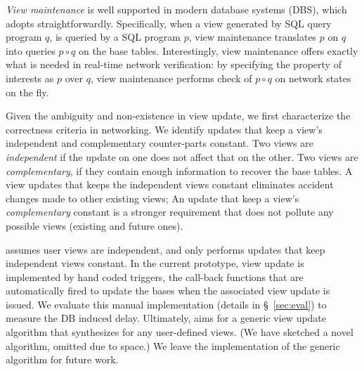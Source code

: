 \textit{View maintenance} is well supported in modern database systems
(DBS), which \Sys adopts straightforwardly. Specifically, when a view
generated by SQL query program $q$, is queried by a SQL program $p$,
view maintenance translates $p$ on $q$ into queries $p \circ q$ on the
base tables.
Interestingly, view maintenance offers exactly what is needed in
real-time network verification: by specifying the property of interests
as $p$ over $q$, view maintenance performs check of $p \circ q$ on
network states on the fly. %

Given the ambiguity and non-existence in view update, we first
characterize the correctness criteria in networking. We identify
updates that keep a view's independent and complementary counter-parts
constant. Two views are \textit{independent} if the update on one does
not affect that on the other. Two views are \textit{complementary}, if
they contain enough information to recover the base tables.
A view updates that keeps the independent views constant eliminates
accident changes made to other existing views; An update that keep a
view's \textit{complementary} constant is a stronger requirement that
does not pollute any possible views (existing and future ones).

\Sys assumes user views are independent, and only performs updates
that keep independent views constant.  In the current prototype, view
update is implemented by hand coded triggers, the call-back functions
that are automatically fired to update the bases when the associated
view update is issued. We evaluate this manual implementation (details
in \S~\ref{sec:eval}) to measure the DB induced delay.
Ultimately, \Sys aims for a generic view update algorithm that
synthesizes for any user-defined views. (We have sketched a novel
algorithm, omitted due to space.) We leave the implementation of the
generic algorithm for future work.


